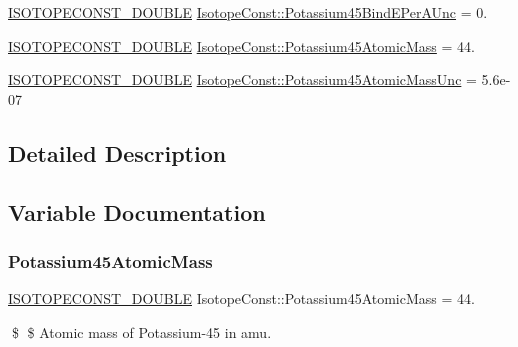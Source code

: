 \begin{DoxyCompactItemize}
\mbox{\hyperlink{group___isotope_const-_macros_ga8f45a7272ce02c0b4c65c44636ed719a}{I\+S\+O\+T\+O\+P\+E\+C\+O\+N\+S\+T\+\_\+\+D\+O\+U\+B\+LE}} \mbox{\hyperlink{group___isotope_const-_potassium-_k45_gaa9046560227a56c0e3d890300488c9c9}{Isotope\+Const\+::\+Potassium45\+Bind\+E\+Per\+A\+Unc}} = 0.
\item 
\mbox{\hyperlink{group___isotope_const-_macros_ga8f45a7272ce02c0b4c65c44636ed719a}{I\+S\+O\+T\+O\+P\+E\+C\+O\+N\+S\+T\+\_\+\+D\+O\+U\+B\+LE}} \mbox{\hyperlink{group___isotope_const-_potassium-_k45_gaee7b8e86236dfe1cc643d9fd0b38f39a}{Isotope\+Const\+::\+Potassium45\+Atomic\+Mass}} = 44.
\item 
\mbox{\hyperlink{group___isotope_const-_macros_ga8f45a7272ce02c0b4c65c44636ed719a}{I\+S\+O\+T\+O\+P\+E\+C\+O\+N\+S\+T\+\_\+\+D\+O\+U\+B\+LE}} \mbox{\hyperlink{group___isotope_const-_potassium-_k45_ga90279e498475763319736c67ea4fb6f9}{Isotope\+Const\+::\+Potassium45\+Atomic\+Mass\+Unc}} = 5.\+6e-\/07
\end{DoxyCompactItemize}


\subsection{Detailed Description}


\subsection{Variable Documentation}
\mbox{\label{group___isotope_const-_potassium-_k45_gaee7b8e86236dfe1cc643d9fd0b38f39a}} 
\subsubsection{\texorpdfstring{Potassium45\+Atomic\+Mass}{Potassium45AtomicMass}}
{\footnotesize\ttfamily \mbox{\hyperlink{group___isotope_const-_macros_ga8f45a7272ce02c0b4c65c44636ed719a}{I\+S\+O\+T\+O\+P\+E\+C\+O\+N\+S\+T\+\_\+\+D\+O\+U\+B\+LE}} Isotope\+Const\+::\+Potassium45\+Atomic\+Mass = 44.}

\$ \$ Atomic mass of Potassium-\/45 in amu. \mbox{\label{group___isotope_const-_potassium-_k45_ga90279e498475763319736c67ea4fb6f9}} 
